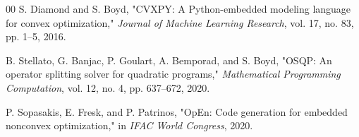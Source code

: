 \documentclass[conference]{IEEEtran}
\begin{document}
\begin{thebibliography}{00}
S. Diamond and S. Boyd, "CVXPY: A Python-embedded modeling language for convex optimization," \textit{Journal of Machine Learning Research}, vol. 17, no. 83, pp. 1–5, 2016.

B. Stellato, G. Banjac, P. Goulart, A. Bemporad, and S. Boyd, "OSQP: An operator splitting solver for quadratic programs," \textit{Mathematical Programming Computation}, vol. 12, no. 4, pp. 637–672, 2020.

P. Sopasakis, E. Fresk, and P. Patrinos, "OpEn: Code generation for embedded nonconvex optimization," in \textit{IFAC World Congress}, 2020.

\end{thebibliography}
\end{document}
